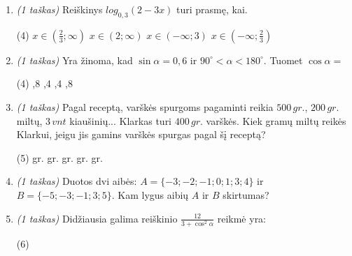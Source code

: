 \documentclass[a4paper]{article}
\begin{document}
\begin{enumerate}
      \item \textit{(1 taškas)} Reiškinys $log_{0,3}(2-3x)$ turi prasmę, kai.
            \begin{tasks}[item-format={\normalfont}, after-item-skip=2mm,
                        label=\Alph*, label-format={\bfseries}](4)
                  \task $x\in(\frac{2}{3};\infty)$
                  \task $x\in(2;\infty)$
                  \task $x\in(-\infty;3)$
                  \task $x\in(-\infty;\frac{2}{3})$
            \end{tasks}
      \item \textit{(1 taškas)} Yra žinoma, kad $\sin\alpha=0,6$ ir
            $90^\circ<\alpha<180^\circ$. Tuomet $\cos\alpha=$
            \begin{tasks}[item-format={\normalfont}, after-item-skip=2mm,
                        label=\Alph*, label-format={\bfseries}](4)
                  ,8
                  ,4
                  ,4
                  ,8
            \end{tasks}
      \item \textit{(1 taškas)} Pagal receptą, varškės spurgoms pagaminti
            reikia $500\,gr.$, $200\,gr.$ miltų, $3\,vnt$ kiaušinių... Klarkas
            turi $400\,gr.$
            varškės. Kiek gramų miltų reikės Klarkui, jeigu jis gamins varškės
            spurgas pagal šį receptą?
            \begin{tasks}[item-format={\normalfont}, after-item-skip=2mm,
                        label=\Alph*, label-format={\bfseries}](5)
                   gr.
                   gr.
                   gr.
                   gr.
                   gr.
            \end{tasks}
      \item \textit{(1 taškas)} Duotos dvi aibės: $A=\{-3;-2;-1;0;1;3;4\}$ ir
            $B=\{-5;-3;-1;3;5\}$. Kam lygus aibių $A$ ir $B$ skirtumas?
            \vspace{7mm}

      \item \textit{(1 taškas)} Didžiausia galima reiškinio
            $\frac{12}{3+\cos^2\alpha}$ reikmė yra:
            \begin{tasks}[item-format={\normalfont}, after-item-skip=2mm,
                        label=\Alph*, label-format={\bfseries}](6)
            \end{tasks}


\end{enumerate}
\end{document}
